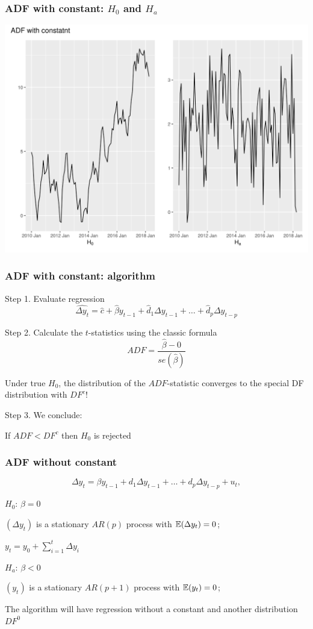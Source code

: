 \begin{frame}
	\frametitle{ADF with constant: $H_0$ and $H_a$}
	\includegraphics[width=\textwidth]{pictures/om_ts_06-046.png}
	
\end{frame}

\begin{frame}
	\frametitle{ADF with constant: algorithm}
	
	Step 1. Evaluate \alert{regression}
	\[
	\widehat{\Delta y_t} = \hat c + \hat \beta y_{t-1} + \hat d_1 \Delta y_{t-1} + \ldots + \hat d_p \Delta y_{t-p}
	\]
	
	\pause
	Step 2. Calculate the $t$-statistics using the \alert{classic formula}
	\[
	ADF = \frac{\hat \beta - 0}{se(\hat \beta)}
	\]
	
	\pause
	Under true $H_0$, the distribution of the $ADF$-statistic converges to the  special  \alert{DF distribution} with $DF^c$!
	
	\pause
	Step 3. We conclude:
	
	If $ADF < DF^c$ then $H_0$ is rejected
	
\end{frame}


\begin{frame}
	\frametitle{ADF without constant}
	\[
	\Delta y_t = \beta y_{t-1} + d_1 \Delta y_{t-1} + \ldots + d_p \Delta y_{t-p} + u_t,
	\]
	
	\pause
	
	\alert{$H_0$: $\beta = 0$}
	
	$(\Delta y_t)$ is a stationary $AR(p)$ process with $\mathbb{E}(\Delta y_t) = 0$;
	
	$y_t = y_0 + \sum_{i=1}^t \Delta y_i $
	
	\pause
	
	\alert{$H_a$: $\beta < 0$}
	
	$(y_t)$ is a stationary $AR(p + 1)$ process with $\mathbb{E}(y_t) = 0$;
	
	\pause
	
	The algorithm will have \alert{regression without a constant} and another distribution $DF^0$
	
\end{frame}


